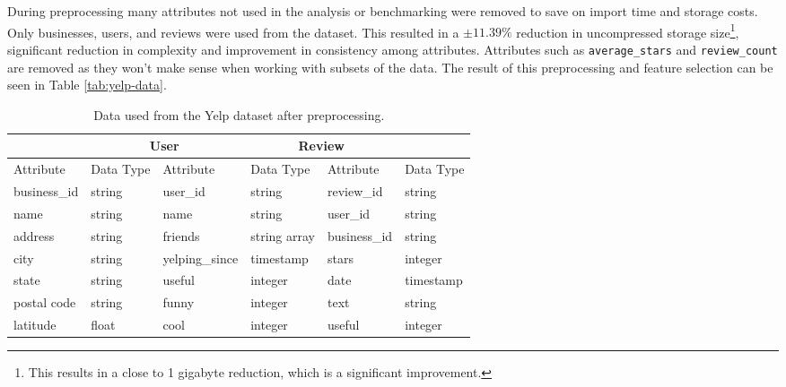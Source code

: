 During preprocessing many attributes not used in the analysis or benchmarking were removed to save on import time and storage costs. Only businesses, users, and reviews were used from the dataset. This resulted in a $\pm11.39\%$ reduction in uncompressed storage size\footnote{This results in a close to 1 gigabyte reduction, which is a significant improvement.}, significant reduction in complexity and improvement in consistency among attributes. Attributes such as \texttt{average\_stars} and \texttt{review\_count} are removed as they won't make sense when working with subsets of the data. The result of this preprocessing and feature selection can be seen in Table \ref{tab:yelp-data}.

\begin{table*}[h]
    \centering
    \small
    \caption{Data used from the Yelp dataset after preprocessing.}
    \vspace*{5mm}
    \begin{tabular}{ |p{2cm}|p{2cm}||p{2cm}|p{2cm}||p{2cm}|p{2cm}|}
        \hline
        \rowcolor{Gray}
        \multicolumn{2}{|c||}{Business} & \multicolumn{2}{|c||}{User} & \multicolumn{2}{|c|}{Review}                                           \\
        \hline
        \rowcolor{LightGray}
        Attribute                       & Data Type                   & Attribute       & Data Type    & Attribute    & Data Type \\
        \hline
        business\_id                    & string                      & user\_id        & string       & review\_id   & string    \\
        name                            & string                      & name            & string       & user\_id     & string    \\
        address                         & string                      & friends         & string array & business\_id & string    \\
        city                            & string                      & yelping\_since  & timestamp    & stars        & integer   \\
        state                           & string                      &  useful         & integer      & date         & timestamp \\
        postal code                     & string                      &  funny          & integer      & text         & string    \\
        latitude                        & float                       &  cool           & integer      & useful       & integer   \\

\end{tabular}
\end{table*}
